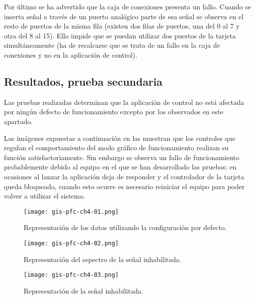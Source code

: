 Por último se ha advertido que la caja de conexiones presenta un fallo.
Cuando se inserta señal a través de un puerto analógico parte de esa señal
se observa en el resto de puertos de la misma fila (existen dos filas de
puertos, una del 0 al 7 y otra del 8 al 15). Ello impide que se puedan
utilizar dos puertos de la tarjeta simultáneamente (ha de recalcarse que se
trata de un fallo en la caja de conexiones y no en la aplicación de
control).


\subsection{Resultados, prueba secundaria}

Las pruebas realizadas determinan que la aplicación de control no está
afectada por ningún defecto de funcionamiento excepto por los observados en
este apartado.

Las imágenes expuestas a continuación en las
 muestran que los controles que
regulan el comportamiento del modo gráfico de funcionamiento realizan su
función satisfactoriamente. Sin embargo se observa un fallo de
funcionamiento probablemente debido al equipo en el que se han desarrollado
las pruebas: en ocasiones al lanzar la aplicación \matlab{} deja de
responder y el controlador de la tarjeta queda bloqueado, cuando esto
ocurre es necesario reiniciar el equipo para poder volver a utilizar el
sistema.

\begin{figure}
    \begin{center}
	\texttt{[image: gis-pfc-ch4-01.png]}
    \end{center}
    \caption[Configuración por defecto]{Representación de los datos
    utilizando la configuración por defecto.}
    \label{fig:default}
\end{figure}

\begin{figure}[p]
    \begin{center}
	\texttt{[image: gis-pfc-ch4-02.png]}
    \end{center}
    \caption[Representación del espectro de la señal
    inhabilitada]{Representación del espectro de la señal inhabilitada.}
    \label{fig:specter-disabled}
\end{figure}

\begin{figure}[p]
    \begin{center}
	\texttt{[image: gis-pfc-ch4-03.png]}
    \end{center}
    \caption[Representación de la señal inhabilitada]{Representación de la
    señal inhabilitada.}
    \label{fig:signal-disabled}
\end{figure}

